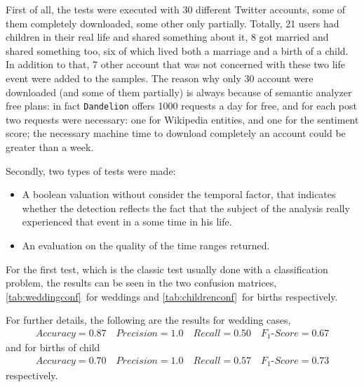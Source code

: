 First of all, the tests were executed with 30 different Twitter accounts, some of them completely downloaded, some other only partially. Totally, 21 users had children in their real life and shared something about it, 8 got married and shared something too, six of which lived both a marriage and a birth of a child. In addition to that, 7 other account that was not concerned with these two life event were added to the samples. The reason why only 30 account were downloaded (and some of them partially) is always because of semantic analyzer free plans: in fact \texttt{Dandelion} offers 1000 requests a day for free, and for each post two requests were necessary: one for Wikipedia entities, and one for the sentiment score; the necessary machine time to download completely an account could be greater than a week.

Secondly, two types of tests were made:
\begin{itemize}
\item A boolean valuation without consider the temporal factor, that indicates whether the detection reflects the fact that the subject of the analysis really experienced that event in a some time in his life.
\item An evaluation on the quality of the time ranges returned.
\end{itemize}
For the first test, which is the classic test usually done with a classification problem, the results can be seen in the two confusion matrices, \ref{tab:weddingconf}~for weddings and \ref{tab:childrenconf}~for births respectively.

For further details, the following are the results for wedding cases,
\begin{gather}
Accuracy = 0.87 \quad Precision = 1.0 \quad Recall = 0.50 \quad F_1\text{-}Score = 0.67
\label{weddingconfdata}
\end{gather}
and for births of child
\begin{gather}
Accuracy = 0.70 \quad Precision = 1.0 \quad Recall = 0.57 \quad F_1\text{-}Score = 0.73
\label{childrenconfdata}
\end{gather}
respectively.

